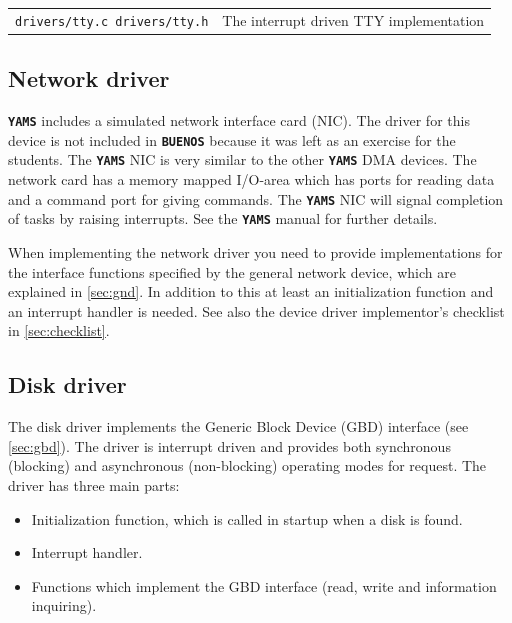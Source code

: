 \documentclass[twoside,a4paper]{report}
\newcommand{\PBS}[1]{\let\temp=\\#1\let\\=\temp}
\newlength{\tablewidth}
\newcommand{\buenos}{\texttt{\textbf{BUENOS}}}
\newcommand{\yams}{\texttt{\textbf{YAMS}}}
\newenvironment{filelist}[0]{%
\vspace{\baselineskip}%
\begin{center}%
\begin{tabular}{p{4cm}>{\PBS\raggedright}p{\tablewidth-4\tabcolsep-4cm}}%
\hline%
}{%
\end{tabular}%
\end{center}%
}
\newcommand{\file}[2]{\texttt{#1} \vspace{2mm} & #2 \vspace{2mm}\\}
\begin{document}
\begin{filelist}
\file{drivers/tty.c drivers/tty.h}{The interrupt driven TTY
  implementation}
\end{filelist}

\subsection{Network driver}
\label{sec:nic}

\yams{} includes a simulated network interface card (NIC). The driver
for this device is not included in \buenos{} because it was left as an
exercise for the students. The \yams{} NIC is very similar to the other
\yams{} DMA devices. The network card has a memory mapped I/O-area
which has ports for reading data and a command port for giving
commands. The \yams{} NIC will signal completion of tasks by raising
interrupts. See the \yams{} manual for further details.

When implementing the network driver you need to provide
implementations for the interface functions specified by the general
network device, which are explained in \autoref{sec:gnd}. In
addition to this at least an initialization function and an interrupt
handler is needed. See also the device driver implementor's
checklist in \autoref{sec:checklist}.

\subsection{Disk driver}
\label{sec:diskdriver}

The disk driver implements the Generic Block Device (GBD) interface
(see \autoref{sec:gbd}). The driver is interrupt driven and provides both
synchronous (blocking) and asynchronous (non-blocking) operating modes
for request. The driver has three main parts:

\begin{itemize}

\item Initialization function, which is called in startup when a disk
is found.

\item Interrupt handler.

\item Functions which implement the GBD interface (read, write and
information inquiring).

\end{itemize}
\end{document}

